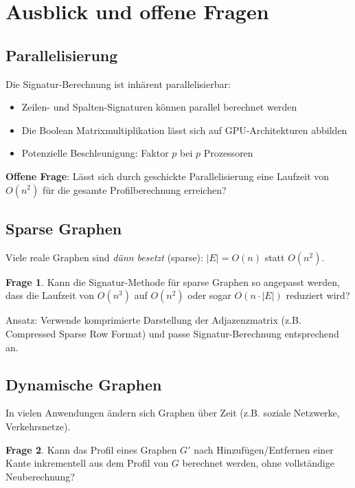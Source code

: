 ﻿\documentclass[a4paper,12pt]{article}
\theoremstyle{definition}
\newtheorem{frage}{Frage}
\begin{document}
	\section{Ausblick und offene Fragen}
	
	\subsection{Parallelisierung}
	
	Die Signatur-Berechnung ist inhärent parallelisierbar:
	
	\begin{itemize}
		\item[-] Zeilen- und Spalten-Signaturen können parallel berechnet werden
		\item[-] Die Boolean Matrixmultiplikation lässt sich auf GPU-Architekturen abbilden
		\item[-] Potenzielle Beschleunigung: Faktor $p$ bei $p$ Prozessoren
	\end{itemize}
	
	\textbf{Offene Frage}: Lässt sich durch geschickte Parallelisierung eine Laufzeit von $O(n^2)$ für die gesamte Profilberechnung erreichen?
	
	\subsection{Sparse Graphen}
	
	Viele reale Graphen sind \textit{dünn besetzt} (sparse): $|E| = O(n)$ statt $O(n^2)$.
	
	\begin{frage}
		Kann die Signatur-Methode für sparse Graphen so angepasst werden, dass die Laufzeit von $O(n^3)$ auf $O(n^2)$ oder sogar $O(n \cdot |E|)$ reduziert wird?
	\end{frage}
	
	Ansatz: Verwende komprimierte Darstellung der Adjazenzmatrix (z.B. Compressed Sparse Row Format) und passe Signatur-Berechnung entsprechend an.
	
	\subsection{Dynamische Graphen}
	
	In vielen Anwendungen ändern sich Graphen über Zeit (z.B. soziale Netzwerke, Verkehrsnetze).
	
	\begin{frage}
		Kann das Profil eines Graphen $G'$ nach Hinzufügen/Entfernen einer Kante inkrementell aus dem Profil von $G$ berechnet werden, ohne vollständige Neuberechnung?
	\end{frage}
	
\end{document}
